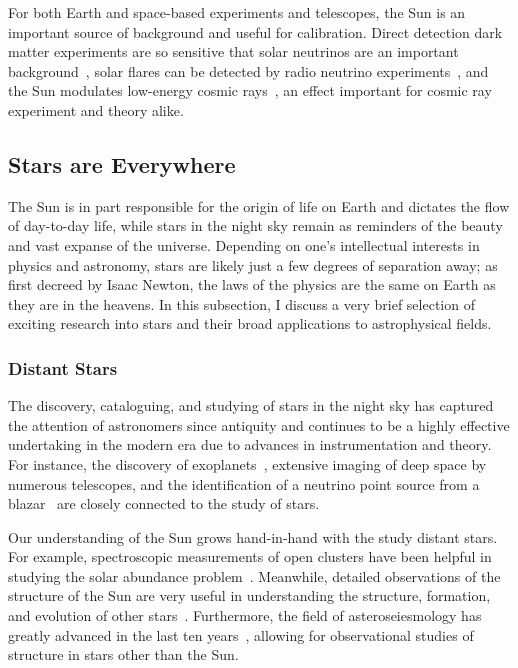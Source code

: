 \documentclass[12pt]{article}
\begin{document}
For both Earth and space-based experiments and telescopes, the Sun is an important source of background and useful for calibration. Direct detection dark matter experiments are so sensitive that solar neutrinos are an important background~\cite{Essig2018}, solar flares can be detected by radio neutrino experiments~\cite{Agarwal2024}, and the Sun modulates low-energy cosmic rays~\cite{Corti2015}, an effect important for cosmic ray experiment and theory alike.

\subsection{Stars are Everywhere}
The Sun is in part responsible for the origin of life on Earth and dictates the flow of day-to-day life, while stars in the night sky remain as reminders of the beauty and vast expanse of the universe. Depending on one's intellectual interests in physics and astronomy, stars are likely just a few degrees of separation away; as first decreed by Isaac Newton, the laws of the physics are the same on Earth as they are in the heavens. In this subsection, I discuss a very brief selection of exciting research into stars and their broad applications to astrophysical fields.

\subsubsection{Distant Stars}
The discovery, cataloguing, and studying of stars in the night sky has captured the attention of astronomers since antiquity and continues to be a highly effective undertaking in the modern era due to advances in instrumentation and theory. For instance, the discovery of exoplanets~\cite{Wolszczan1992}, extensive imaging of deep space by numerous telescopes, and the identification of a neutrino point source from a blazar~\cite{TXSneutrino} are closely connected to the study of stars. 

Our understanding of the Sun grows hand-in-hand with the study distant stars. For example, spectroscopic measurements of open clusters have been helpful in studying the solar abundance problem~\cite{VandenBerg_2007}. Meanwhile, detailed observations of the structure of the Sun are very useful in understanding the structure, formation, and evolution of other stars~\cite{Christensen_Dalsgaard_2021}. Furthermore, the field of asteroseiesmology has greatly advanced in the last ten years~\cite{Garc2019}, allowing for observational studies of structure in stars other than the Sun.
\end{document}
